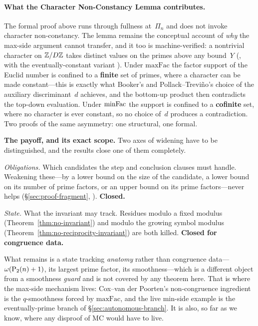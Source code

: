 \paragraph{What the Character Non-Constancy Lemma contributes.}
The formal proof above runs through fullness at~$\Pi_n$ and does not
invoke character non-constancy.  The lemma remains the conceptual
account of \emph{why} the max-side argument cannot transfer, and it too
is machine-verified: a nontrivial character on $\mathbb{Z}/D\mathbb{Z}$ takes distinct
values on the primes above any bound~$Y$
(,
with the eventually-constant variant
).
Under $\mathrm{maxFac}$ the factor support of the Euclid number is
confined to a \textbf{finite} set of primes, where a character can be
made constant---this is exactly what Booker's and Pollack--Treviño's
choice of the auxiliary discriminant~$d$ achieves, and the bottom-up
product then contradicts the top-down evaluation.  Under $\mathrm{minFac}$ the
support is confined to a \textbf{cofinite} set, where no character is
ever constant, so no choice of~$d$ produces a contradiction.  Two proofs
of the same asymmetry: one structural, one formal.

\begin{frontierbox}
\textbf{The payoff, and its exact scope.}  Two axes of widening have to
be distinguished, and the results close one of them completely.

\smallskip
\noindent\emph{Obligations.}  Which candidates the step and conclusion
clauses must handle.  Weakening these---by a lower bound on the size of
the candidate, a lower bound on its number of prime factors, or an upper
bound on its prime factors---never helps
(\S\ref{sec:proof-fragment},
).
\textbf{Closed.}

\smallskip
\noindent\emph{State.}  What the invariant may track.  Residues modulo a
fixed modulus (Theorem~\ref{thm:no-invariant}) and modulo the growing
symbol modulus (Theorem~\ref{thm:no-reciprocity-invariant}) are both
killed.  \textbf{Closed for congruence data.}

\smallskip\noindent
What remains is a state tracking \emph{anatomy} rather than congruence
data---$\omega(\mathrm{P}_{2}(n)+1)$, its largest prime factor, its
smoothness---which is a different object from a smoothness \emph{guard}
and is not covered by any theorem here.  That is where the max-side
mechanism lives: Cox--van der Poorten's non-congruence ingredient is the
$q$-smoothness forced by $\mathrm{maxFac}$, and the live min-side
example is the eventually-prime branch of
\S\ref{sec:autonomous-branch}.  It is also, so far as we know, where any
disproof of MC would have to live.
\end{frontierbox}

